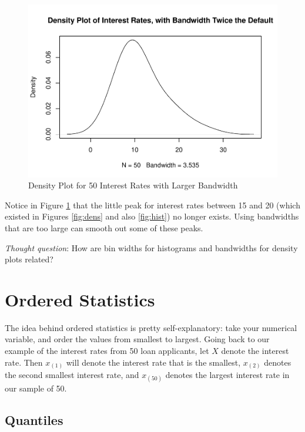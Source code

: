 \documentclass[
]{book}
\begin{document}
\begin{figure}
\centering
\includegraphics{bookdown-demo_files/figure-latex/dens2-1.pdf}
\caption{\label{fig:dens2}Density Plot for 50 Interest Rates with Larger Bandwidth}
\end{figure}

Notice in Figure \ref{fig:dens2} that the little peak for interest rates between 15 and 20 (which existed in Figures \ref{fig:dens} and also \ref{fig:hist}) no longer exists. Using bandwidths that are too large can smooth out some of these peaks.

\emph{Thought question}: How are bin widths for histograms and bandwidths for density plots related?

\hypertarget{ordered-statistics}{%
\section{Ordered Statistics}\label{ordered-statistics}}

The idea behind ordered statistics is pretty self-explanatory: take your numerical variable, and order the values from smallest to largest. Going back to our example of the interest rates from 50 loan applicants, let \(X\) denote the interest rate. Then \(x_{(1)}\) will denote the interest rate that is the smallest, \(x_{(2)}\) denotes the second smallest interest rate, and \(x_{(50)}\) denotes the largest interest rate in our sample of 50.

\hypertarget{quantiles}{%
\subsection{Quantiles}\label{quantiles}}
\end{document}
